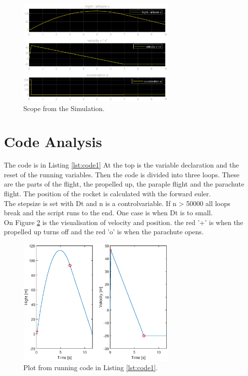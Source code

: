 	
	\begin{figure}[H]
		\centering
		\includegraphics[width=0.7\textwidth]{figures/scope.eps}
		\caption{Scope from the Simulation.}
		\label{fig:scope1}
	\end{figure}

\newpage

\section{Code Analysis}
The code is in Listing \ref{lst:code1}
At the top is the variable declaration and the reset of the running variables.
Then the code is divided into three loops. These are the parts of the flight, the propelled up, the paraple flight and the parachute flight. The position of the rocket is calculated with the forward euler.\\
The stepsize is set with Dt and n is a controlvariable. If n > 50000 all loops break and the script runs to the end. One case is when Dt is to small.\\
On Figure \ref{fig:plot1} is the visualisation of velocity and position. the red '+' is when the propelled up turns off and the red 'o' is when the parachute opens.

	\begin{figure}[H]
		\centering
		\includegraphics[width=0.7\textwidth]{figures/plot1.eps}
		\caption{Plot from running code in Listing \ref{lst:code1}.}
		\label{fig:plot1}
	\end{figure}
	
